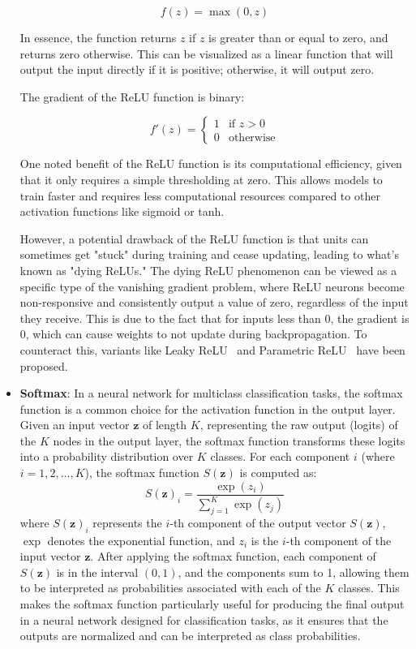 \begin{itemize}
\[
f(z) = \max(0, z)
\]

In essence, the function returns \( z \) if \( z \) is greater than or equal to zero, and returns zero otherwise. This can be visualized as a linear function that will output the input directly if it is positive; otherwise, it will output zero.

The gradient of the ReLU function is binary:

\[
f'(z) = 
\begin{cases} 
1 & \text{if } z > 0 \\
0 & \text{otherwise}
\end{cases}
\]

One noted benefit of the ReLU function is its computational efficiency, given that it only requires a simple thresholding at zero. This allows models to train faster and requires less computational resources compared to other activation functions like sigmoid or tanh.

However, a potential drawback of the ReLU function is that units can sometimes get "stuck" during training and cease updating, leading to what's known as "dying ReLUs." The dying ReLU phenomenon can be viewed as a specific type of the vanishing gradient problem, where ReLU neurons become non-responsive and consistently output a value of zero, regardless of the input they receive. This is due to the fact that for inputs less than 0, the gradient is 0, which can cause weights to not update during backpropagation. To counteract this, variants like Leaky ReLU~\cite{maas2013rectifier} and Parametric ReLU~\cite{he2015delving} have been proposed.
\item \textbf{Softmax}:
In a neural network for multiclass classification tasks, the softmax function is a common choice for the activation function in the output layer. Given an input vector \( \mathbf{z} \) of length \( K \), representing the raw output (logits) of the \( K \) nodes in the output layer, the softmax function transforms these logits into a probability distribution over \( K \) classes. For each component \( i \) (where \( i = 1, 2, \ldots, K \)), the softmax function \( S(\mathbf{z}) \) is computed as:
\[
S(\mathbf{z})_i = \frac{{\exp(z_i)}}{{\sum_{j=1}^{K} \exp(z_j)}}
\]
where \( S(\mathbf{z})_i \) represents the \( i \)-th component of the output vector \( S(\mathbf{z}) \), \( \exp \) denotes the exponential function, and \( z_i \) is the \( i \)-th component of the input vector \( \mathbf{z} \). After applying the softmax function, each component of \( S(\mathbf{z}) \) is in the interval \( (0, 1) \), and the components sum to 1, allowing them to be interpreted as probabilities associated with each of the \( K \) classes. This makes the softmax function particularly useful for producing the final output in a neural network designed for classification tasks, as it ensures that the outputs are normalized and can be interpreted as class probabilities.

\end{itemize}

